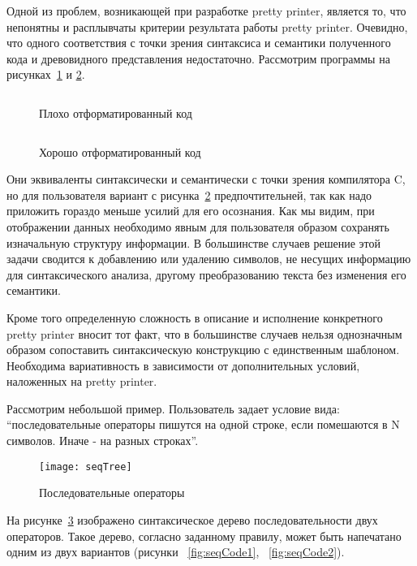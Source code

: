 Одной из проблем, возникающей при разработке pretty printer, является то, что непонятны и расплывчаты критерии результата работы pretty printer.
Очевидно, что одного соответствия с точки зрения синтаксиса и семантики полученного кода и древовидного представления недостаточно. Рассмотрим программы на рисунках~\ref{fig:wikiExUnfor} и \ref{fig:wikiExBSD}.

\begin{figure}[h!]
	\centering
	\inputminted{c}{codes/wikiExUnfor.c}
	\caption{Плохо отформатированный код}
	\label{fig:wikiExUnfor}
\end{figure}

\begin{figure}[h!]
	\centering
	\inputminted{c}{codes/wikiExBSD.c}
	\caption{Хорошо отформатированный код}
	\label{fig:wikiExBSD}
\end{figure}

Они эквиваленты синтаксически и семантически с точки зрения компилятора C, но для пользователя вариант с рисунка~\ref{fig:wikiExBSD} предпочтительней, так как надо приложить гораздо меньше усилий для его осознания. Как мы видим, при отображении данных необходимо явным для пользователя образом сохранять изначальную структуру информации. В большинстве случаев решение этой задачи сводится к добавлению или удалению символов, не несущих информацию для синтаксического анализа, другому преобразованию текста без изменения его семантики.

Кроме того определенную сложность в описание и исполнение конкретного pretty printer вносит тот факт, что в большинстве случаев нельзя однозначным образом сопоставить синтаксическую конструкцию с единственным шаблоном. Необходима вариативность в зависимости от дополнительных условий, наложенных на pretty printer.

Рассмотрим небольшой пример. Пользователь задает условие вида: “последовательные операторы пишутся на одной строке, если помешаются в N символов. Иначе - на разных строках”.

\begin{figure}[h]
	\centering
	\texttt{[image: seqTree]}
	\caption{Последовательные операторы}
	\label{fig:seqImage}
\end{figure}

На рисунке~\ref{fig:seqImage} изображено синтаксическое дерево последовательности двух операторов. Такое дерево, согласно заданному правилу, может быть напечатано одним из двух вариантов (рисунки ~\ref{fig:seqCode1}, ~\ref{fig:seqCode2}).

